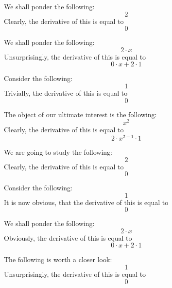 \documentclass{article}
\begin{document}
We shall ponder the following:
\begin{equation}
2 
\end{equation}
Clearly, the derivative of this is equal to
\begin{equation}
0 
\end{equation}

We shall ponder the following:
\begin{equation}
2 \cdot x 
\end{equation}
Unsurprisingly, the derivative of this is equal to
\begin{equation}
0 \cdot x + 2 \cdot 1 
\end{equation}

Consider the following:
\begin{equation}
1 
\end{equation}
Trivially, the derivative of this is equal to
\begin{equation}
0 
\end{equation}

The object of our ultimate interest is the following:
\begin{equation}
x ^{2 } 
\end{equation}
Clearly, the derivative of this is equal to
\begin{equation}
2 \cdot x ^{2 - 1 } \cdot 1 
\end{equation}

We are going to study the following:
\begin{equation}
2 
\end{equation}
Clearly, the derivative of this is equal to
\begin{equation}
0 
\end{equation}

Consider the following:
\begin{equation}
1 
\end{equation}
It is now obvious, that the derivative of this is equal to
\begin{equation}
0 
\end{equation}

We shall ponder the following:
\begin{equation}
2 \cdot x 
\end{equation}
Obviously, the derivative of this is equal to
\begin{equation}
0 \cdot x + 2 \cdot 1 
\end{equation}

The following is worth a closer look:
\begin{equation}
1 
\end{equation}
Unsurprisingly, the derivative of this is equal to
\begin{equation}
0 
\end{equation}
\end{document}
